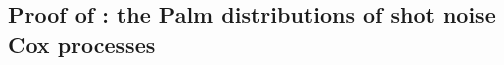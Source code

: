 \documentclass[11pt,a4paper,oneside]{article}
\newcommand{\deq}{\stackrel{\mbox{\scriptsize d}}{=}}
\newcommand{\dd}{\mathrm d}
\newcommand{\X}{\mathbb{X}}
\renewcommand{\mid}{\ensuremath{\,|\,}}
\theoremstyle{definition}
\theoremstyle{remark}
\begin{document}
\subsection{Proof of : the Palm distributions of shot noise Cox processes}


\end{document}
